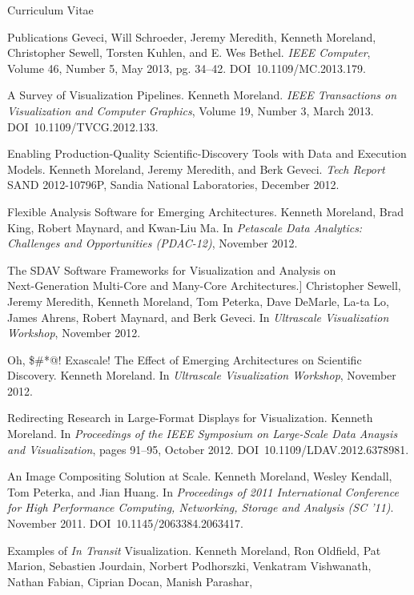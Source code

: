 \documentclass{article}
\begin{document}
\begin{cv}{Curriculum Vitae}
\begin{cvlist}{Publications}
      Geveci, Will Schroeder, Jeremy Meredith, Kenneth Moreland,
      Christopher Sewell, Torsten Kuhlen, and E. Wes Bethel. \emph{IEEE
        Computer}, Volume 46, Number 5, May 2013, pg. 34--42.
      DOI~10.1109/MC.2013.179.
    \item[A Survey of Visualization Pipelines.] Kenneth
      Moreland. \emph{IEEE Transactions on Visualization and Computer
        Graphics}, Volume 19, Number 3, March 2013.
      DOI~10.1109/TVCG.2012.133.
    \item[Enabling Production-Quality Scientific-Discovery Tools with Data
      and] Execution Models. Kenneth Moreland, Jeremy Meredith, and Berk
      Geveci. \emph{Tech Report} SAND 2012-10796P, Sandia National
      Laboratories, December 2012.
    \item[Flexible Analysis Software for Emerging Architectures.] Kenneth
      Moreland, Brad King, Robert Maynard, and Kwan-Liu Ma. In
      \emph{Petascale Data Analytics: Challenges and Opportunities
        (PDAC-12)}, November 2012.
    \item[The SDAV Software Frameworks for Visualization and Analysis on]~\\
      Next-Generation Multi-Core and Many-Core Architectures.] Christopher
      Sewell, Jeremy Meredith, Kenneth Moreland, Tom Peterka, Dave DeMarle,
      La-ta Lo, James Ahrens, Robert Maynard, and Berk Geveci. In
      \emph{Ultrascale Visualization Workshop}, November 2012.
    \item[Oh, \$\#*@!  Exascale!  The Effect of Emerging Architectures on
      Scientific] Discovery.  Kenneth Moreland.  In \emph{Ultrascale
      Visualization Workshop}, November 2012.
    \item[Redirecting Research in Large-Format Displays for Visualization.]
      Kenneth Moreland. In \emph{Proceedings of the IEEE Symposium on
        Large-Scale Data Anaysis and Visualization}, pages 91--95, October
      2012. DOI~10.1109/LDAV.2012.6378981.
    \item[An Image Compositing Solution at Scale.] Kenneth Moreland, Wesley
      Kendall, Tom Peterka, and Jian Huang. In \emph{Proceedings of 2011
        International Conference for High Performance Computing,
        Networking, Storage and Analysis (SC '11)}. November
      2011. DOI~10.1145/2063384.2063417.
    \item[Examples of \emph{In Transit} Visualization.] Kenneth Moreland,
      Ron Oldfield, Pat Marion, Sebastien Jourdain, Norbert Podhorszki,
      Venkatram Vishwanath, Nathan Fabian, Ciprian Docan, Manish Parashar,

\end{cvlist}
\end{cv}
\end{document}
